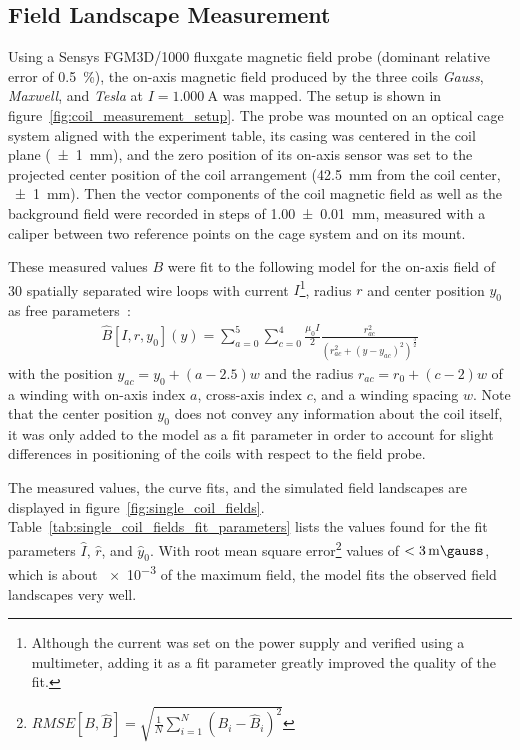 \subsection*{Field Landscape Measurement}
Using a Sensys FGM3D/1000 fluxgate magnetic field probe (dominant relative error of \SI{0.5}{\percent}), the on-axis magnetic field produced by the three coils \textit{Gauss}, \textit{Maxwell}, and \textit{Tesla} at $I = \SI{1.000}{\ampere}$ was mapped. The setup is shown in figure~\ref{fig:coil_measurement_setup}. The probe was mounted on an optical cage system aligned with the experiment table, its casing was centered in the coil plane (\SI[]{+-1}{\milli\meter}), and the zero position of its on-axis sensor was set to the projected center position of the coil arrangement (\SI[]{42.5}{\milli\meter} from the coil center, \SI[]{+-1}{\milli\meter}). Then the vector components of the coil magnetic field as well as the background field were recorded in steps of \SI[]{1.00(1)}{\milli\meter}, measured with a caliper between two reference points on the cage system and on its mount.

These measured values $B$ were fit to the following model for the on-axis field of \SI{30}{} spatially separated wire loops with current $I$\footnote{Although the current was set on the power supply and verified using a multimeter, adding it as a fit parameter greatly improved the quality of the fit.}, radius $r$ and center position $y_0$ as free parameters~\cite{demtroder_statische_2013}:
\begin{align}\label{eq:on_axis_field_model}
    \hat B[I, r, y_0](y) = \sum\limits_{a = 0}^5 \sum\limits_{c = 0}^4 \frac{\mu_0 I}{2} \frac{r_{ac}^2}{\left(r_{ac}^2 + (y - y_{ac})^2\right)^\frac{3}{2}}
\end{align}
with the position $y_{ac} = y_0 + (a - 2.5) w$ and the radius $r_{ac} = r_0 + (c-2)w$ of a winding with on-axis index $a$, cross-axis index $c$, and a winding spacing $w$. Note that the center position $y_0$ does not convey any information about the coil itself, it was only added to the model as a fit parameter in order to account for slight differences in positioning of the coils with respect to the field probe.

The measured values, the curve fits, and the simulated field landscapes are displayed in figure~\ref{fig:single_coil_fields}. Table~\ref{tab:single_coil_fields_fit_parameters} lists the values found for the fit parameters $\hat I$, $\hat r$, and $\hat y_0$. With root mean square error\footnote{$RMSE[B, \hat B] = \sqrt{\frac{1}{N}\sum_{i = 1}^N (B_i-\hat B_i)^2}$} values of $<\SI{3}{\milli\gauss}$, which is about \SI{e-3}{} of the maximum field, the model fits the observed field landscapes very well.

